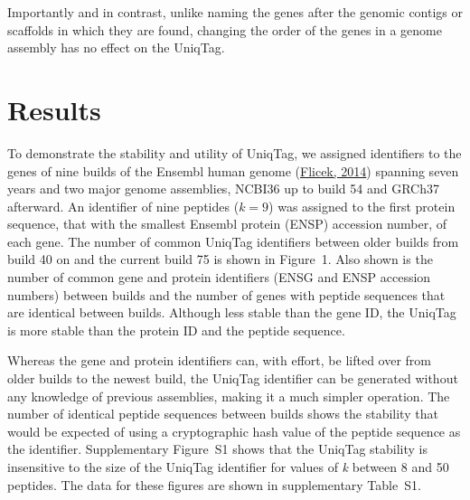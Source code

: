 \documentclass{bioinfo}
\begin{document}
Importantly and in contrast, unlike naming the genes after the genomic
contigs or scaffolds in which they are found, changing the order of the
genes in a genome assembly has no effect on the UniqTag.

\section{Results}\label{results}

To demonstrate the stability and utility of UniqTag, we assigned
identifiers to the genes of nine builds of the Ensembl human genome
(\href{http://dx.doi.org/10.1093/nar/gkt1196}{Flicek, 2014}) spanning
seven years and two major genome assemblies, NCBI36 up to build 54 and
GRCh37 afterward. An identifier of nine peptides ($k=9$) was assigned to
the first protein sequence, that with the smallest Ensembl protein
(ENSP) accession number, of each gene. The number of common UniqTag
identifiers between older builds from build 40 on and the current build
75 is shown in Figure~1. Also shown is the number of common gene and
protein identifiers (ENSG and ENSP accession numbers) between builds and
the number of genes with peptide sequences that are identical between
builds. Although less stable than the gene ID, the UniqTag is more
stable than the protein ID and the peptide sequence.

Whereas the gene and protein identifiers can, with effort, be lifted
over from older builds to the newest build, the UniqTag identifier can
be generated without any knowledge of previous assemblies, making it a
much simpler operation. The number of identical peptide sequences
between builds shows the stability that would be expected of using a
cryptographic hash value of the peptide sequence as the identifier.
Supplementary Figure~S1 shows that the UniqTag stability is insensitive
to the size of the UniqTag identifier for values of \emph{k} between 8
and 50 peptides. The data for these figures are shown in supplementary
Table~S1.
\end{document}
